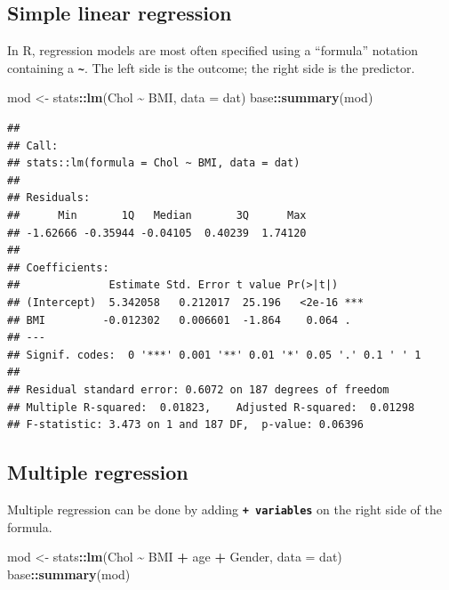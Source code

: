 \documentclass[
]{book}
\newenvironment{Shaded}{\begin{snugshade}}{\end{snugshade}}
\newcommand{\AttributeTok}[1]{\textcolor[rgb]{0.13,0.29,0.53}{#1}}
\newcommand{\FunctionTok}[1]{\textcolor[rgb]{0.13,0.29,0.53}{\textbf{#1}}}
\newcommand{\NormalTok}[1]{#1}
\newcommand{\OtherTok}[1]{\textcolor[rgb]{0.56,0.35,0.01}{#1}}
\newcommand{\SpecialCharTok}[1]{\textcolor[rgb]{0.81,0.36,0.00}{\textbf{#1}}}
\begin{document}
\subsection{Simple linear regression}\label{sec:simpleLinearRegression}

In R, regression models are most often specified using a ``formula'' notation containing a \textbf{\texttt{\textasciitilde{}}}. The left side is the outcome; the right side is the predictor.

\begin{Shaded}
\begin{Highlighting}[]
\NormalTok{mod }\OtherTok{\textless{}{-}}\NormalTok{ stats}\SpecialCharTok{::}\FunctionTok{lm}\NormalTok{(Chol }\SpecialCharTok{\textasciitilde{}}\NormalTok{ BMI, }\AttributeTok{data =}\NormalTok{ dat)}
\NormalTok{base}\SpecialCharTok{::}\FunctionTok{summary}\NormalTok{(mod)}
\end{Highlighting}
\end{Shaded}

\begin{verbatim}
## 
## Call:
## stats::lm(formula = Chol ~ BMI, data = dat)
## 
## Residuals:
##      Min       1Q   Median       3Q      Max 
## -1.62666 -0.35944 -0.04105  0.40239  1.74120 
## 
## Coefficients:
##              Estimate Std. Error t value Pr(>|t|)    
## (Intercept)  5.342058   0.212017  25.196   <2e-16 ***
## BMI         -0.012302   0.006601  -1.864    0.064 .  
## ---
## Signif. codes:  0 '***' 0.001 '**' 0.01 '*' 0.05 '.' 0.1 ' ' 1
## 
## Residual standard error: 0.6072 on 187 degrees of freedom
## Multiple R-squared:  0.01823,    Adjusted R-squared:  0.01298 
## F-statistic: 3.473 on 1 and 187 DF,  p-value: 0.06396
\end{verbatim}

\subsection{Multiple regression}\label{multiple-regression}

Multiple regression can be done by adding \textbf{\texttt{+\ variables}} on the right side of the formula.

\begin{Shaded}
\begin{Highlighting}[]
\NormalTok{mod }\OtherTok{\textless{}{-}}\NormalTok{ stats}\SpecialCharTok{::}\FunctionTok{lm}\NormalTok{(Chol }\SpecialCharTok{\textasciitilde{}}\NormalTok{ BMI }\SpecialCharTok{+}\NormalTok{ age }\SpecialCharTok{+}\NormalTok{ Gender, }\AttributeTok{data =}\NormalTok{ dat)}
\NormalTok{base}\SpecialCharTok{::}\FunctionTok{summary}\NormalTok{(mod)}
\end{Highlighting}
\end{Shaded}
\end{document}
